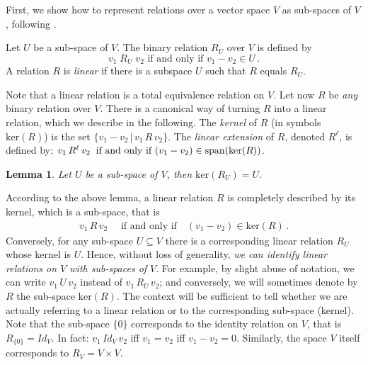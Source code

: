 \documentclass[3p]{elsarticle}
\newcommand{\vectproduct}{\times} %
\newcommand{\kernel}{\mathrm{ker}} %
\newcommand{\Span}{\mathrm{span}}  %
\newtheorem{lemma}{Lemma}
\begin{document}

First, we show how to represent relations over a vector space $V$ as sub-spaces of
$V$, following \cite{Stark,Bor09}.

\begin{definition}\label{Def:LineEq}
Let $U$ be a sub-space of $V$. The binary relation $R_U$ over $V$ is
defined by
\[
v_1\;R_U\;v_2 \mbox{ if and only if }v_1-v_2\in U\,.
\]
A relation $R$ is \emph{linear} if there is a subspace $U$ such that
$R$ equals $R_U$.
\end{definition}

Note that a linear relation is a  total  equivalence relation on
$V$. Let now $R$ be \emph{any} binary  relation  over $V$.  There is
a canonical way of turning $R$  into a linear relation, which we
describe in the following. The \emph{kernel} of $R$ (in symbols
$\kernel(R)$) is the set $\{v_1-v_2 \,|\, v_1\,R\, v_2\}$.
%
The \emph{linear extension} of $R$, denoted $R^\ell$, is defined by:
$ v_1 \,R^\ell \,v_2 \;\;\mbox{\rm if and only if } (v_1-v_2)\in
\Span(\kernel(R)) $.
%

\begin{lemma}\label{lemma:LinEq}
Let $U$ be a sub-space of $V$, then  $\kernel(R_U)=U$.
%
\end{lemma}

According to the above lemma, a linear   relation $R$ is completely
described by its kernel, which is a sub-space, that is
\begin{eqnarray}\label{Eq:LinEq}
v_1 \,R\, v_2 \quad \mbox{ if and only if}\quad (v_1-v_2)\in
\kernel(R)\,.
\end{eqnarray}
Conversely, for any sub-space $U\subseteq V$ there is a
corresponding linear relation $R_U$ whose kernel is $U$.  Hence,
without loss of generality, \emph{we can identify linear   relations
on $V$  with sub-spaces of $V$}. For example,  by slight abuse of
notation, we can write   $v_1\, U\, v_2$ instead of $v_1 \,R_U\,
v_2$; and conversely, we will  sometimes  denote by $R$   the
sub-space $\kernel(R)$.  The context will be sufficient to tell
whether we are actually referring to a linear relation or to the
corresponding sub-space (kernel). Note that the sub-space $\{0\}$
corresponds to the identity relation on $V$, that is
$R_{\{0\}}=Id_V$. In fact: $v_1 \,Id_V\, v_2$ iff $v_1=v_2$ iff
$v_1-v_2=0$. Similarly, the space $V$ itself corresponds to
$R_V=V\vectproduct V$. %
\end{document}
